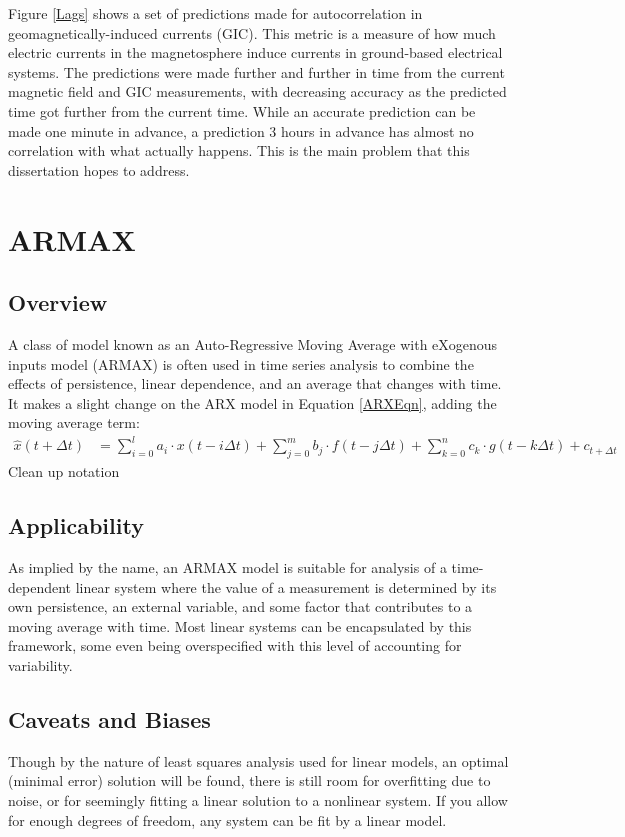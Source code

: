 Figure \ref{Lags} shows a set of predictions made for autocorrelation in geomagnetically-induced currents (GIC). This metric is a measure of how much electric currents in the magnetosphere induce currents in ground-based electrical systems. The predictions were made further and further in time from the current magnetic field and GIC measurements, with decreasing accuracy as the predicted time got further from the current time. While an accurate prediction can be made one minute in advance, a prediction 3 hours in advance has almost no correlation with what actually happens. This is the main problem that this dissertation hopes to address.

\section{ARMAX}

\subsection{Overview}
A class of model known as an Auto-Regressive Moving Average with eXogenous inputs model (ARMAX) is often used in time series analysis to combine the effects of persistence, linear dependence, and an average that changes with time. It makes a slight change on the ARX model in Equation \ref{ARXEqn}, adding the moving average term:
\begin{align}
\hat{x}(t+\Delta t)&=\sum_{i=0}^la_i\cdot x(t-i\Delta t)+\sum_{j=0}^m b_j\cdot f(t-j\Delta t)+\sum_{k=0}^n c_k\cdot g(t-k\Delta t)+c_{t+\Delta t}
\label{ARMAXEqn}
\end{align}
\note Clean up notation


\subsection{Applicability}
As implied by the name, an ARMAX model is suitable for analysis of a time-dependent linear system where the value of a measurement is determined by its own persistence, an external variable, and some factor that contributes to a moving average with time. Most linear systems can be encapsulated by this framework, some even being overspecified with this level of accounting for variability.

\subsection{Caveats and Biases}
Though by the nature of least squares analysis used for linear models, an optimal (minimal error) solution will be found, there is still room for overfitting due to noise, or for seemingly fitting a linear solution to a nonlinear system. If you allow for enough degrees of freedom, any system can be fit by a linear model. 

